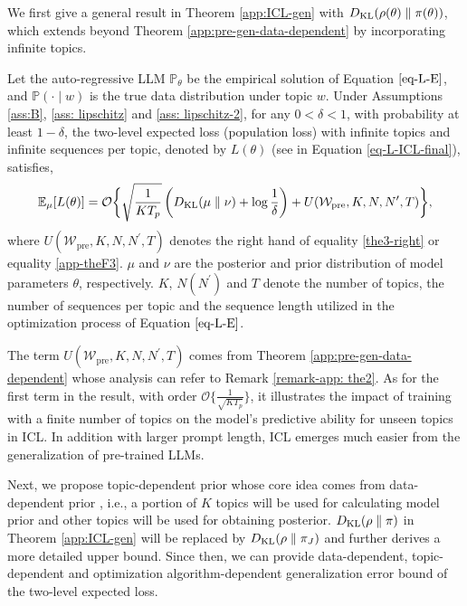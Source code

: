 We first give a general result in Theorem \ref{app:ICL-gen} with $D_{\mathrm{KL}}(\rho(\theta)\parallel \pi(\theta))$, which extends beyond Theorem \ref{app:pre-gen-data-dependent} by incorporating infinite topics.

\begin{theorem}
	\label{app:ICL-gen} Let the auto-regressive LLM $\mathbb{P}_\theta$ be the empirical solution of Equation $\ref{eq-L-E}$, and $\mathbb{P}(\cdot\mid w)$ is the true data distribution under topic $w$. Under Assumptions \ref{ass:B}, \ref{ass: lipschitz} and \ref{ass: lipschitz-2}, for any $0<\delta < 1$, with probability at least $1-\delta$, the two-level expected loss (population loss) with infinite topics and infinite sequences per topic, denoted by $L(\theta)$ (see in Equation \ref{eq-L-ICL-final}), satisfies,
		\begin{align*}
			\mathbb{E}_{\mu}[L(\theta)]
			=\mathcal{O}\biggl\{\sqrt{\frac{1}{KT_p}}\left(D_{\mathrm{KL}}(\mu\parallel \nu)+\log \frac{1}{\delta}\right)+U(\mathcal{W}_{\text{pre}},K,N,N^\prime,T)\biggr\},
		\end{align*}
	where $U(\mathcal{W}_{\text{pre}},K,N,N^\prime,T)$ denotes the right hand of equality \ref{the3-right} or equality \ref{app-theF3}. $\mu$ and $\nu$ are the posterior and prior distribution of model parameters $\theta$, respectively. $K$, $N (N^\prime)$ and $T$ denote the number of topics, the number of sequences per topic and the sequence length utilized in the optimization process of Equation $\ref{eq-L-E}$.
\end{theorem}
\begin{remark}
	The term $U(\mathcal{W}_{\text{pre}},K,N,N^\prime,T)$ comes from Theorem \ref{app:pre-gen-data-dependent} whose analysis can refer to Remark \ref{remark-app: the2}. As for the first term in the result, with order $\mathcal{O}\{\frac{1}{\sqrt{KT_p}}\}$, it illustrates the impact of training with a finite number of topics on the model's predictive ability for unseen topics in ICL. In addition with larger prompt length, ICL emerges much easier from the generalization of pre-trained LLMs. 
\end{remark}

Next, we propose topic-dependent prior whose core idea comes from data-dependent prior \citep{li2019generalization}, i.e., a portion of $K$ topics will be used for calculating model prior and other topics will be used for obtaining posterior. $D_{\mathrm{KL}}(\rho\parallel\pi)$ in Theorem \ref{app:ICL-gen} will be replaced by $D_{\mathrm{KL}}(\rho\parallel\pi_J)$ and further derives a more detailed upper bound. Since then, we can provide data-dependent, topic-dependent and optimization algorithm-dependent generalization error bound of the two-level expected loss.

